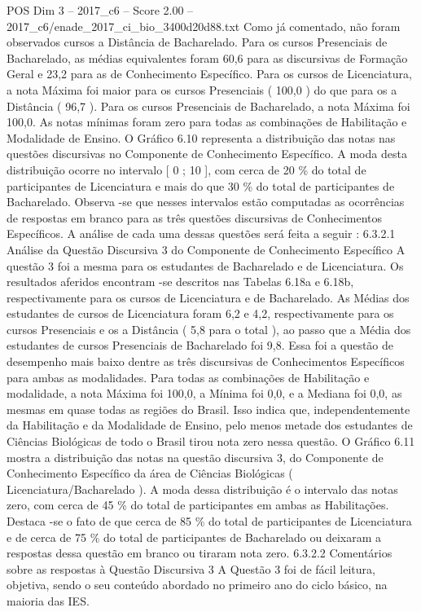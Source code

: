\begin{textsample}{POS Dim 3 – 2017\_c6 – Score 2.00 – 2017\_c6/enade\_2017\_ci\_bio\_3400d20d88.txt}
Como já comentado, não foram observados cursos a Distância de Bacharelado.
Para os cursos Presenciais de Bacharelado, as médias equivalentes foram 60,6 para as discursivas de Formação Geral e 23,2 para as de Conhecimento Específico.
Para os cursos de Licenciatura, a nota Máxima foi maior para os cursos Presenciais ( 100,0 ) do que para os a Distância ( 96,7 ).
Para os cursos Presenciais de Bacharelado, a nota Máxima foi 100,0.
As notas mínimas foram zero para todas as combinações de Habilitação e Modalidade de Ensino.
O Gráfico 6.10 representa a distribuição das notas nas questões discursivas no Componente de Conhecimento Específico.
A moda desta distribuição ocorre no intervalo [ 0 ; 10 ], com cerca de 20 \% do total de participantes de Licenciatura e mais do que 30 \% do total de participantes de Bacharelado.
Observa -se que nesses intervalos estão computadas as ocorrências de respostas em branco para as três questões discursivas de Conhecimentos Específicos.
A análise de cada uma dessas questões será feita a seguir : 6.3.2.1 Análise da Questão Discursiva 3 do Componente de Conhecimento Específico A questão 3 foi a mesma para os estudantes de Bacharelado e de Licenciatura.
Os resultados aferidos encontram -se descritos nas Tabelas 6.18a e 6.18b, respectivamente para os cursos de Licenciatura e de Bacharelado.
As Médias dos estudantes de cursos de Licenciatura foram 6,2 e 4,2, respectivamente para os cursos Presenciais e os a Distância ( 5,8 para o total ), ao passo que a Média dos estudantes de cursos Presenciais de Bacharelado foi 9,8.
Essa foi a questão de desempenho mais baixo dentre as três discursivas de Conhecimentos Específicos para ambas as modalidades.
Para todas as combinações de Habilitação e modalidade, a nota Máxima foi 100,0, a Mínima foi 0,0, e a Mediana foi 0,0, as mesmas em quase todas as regiões do Brasil.
Isso indica que, independentemente da Habilitação e da Modalidade de Ensino, pelo menos metade dos estudantes de Ciências Biológicas de todo o Brasil tirou nota zero nessa questão.
O Gráfico 6.11 mostra a distribuição das notas na questão discursiva 3, do Componente de Conhecimento Específico da área de Ciências Biológicas ( Licenciatura/Bacharelado ).
A moda dessa distribuição é o intervalo das notas zero, com cerca de 45 \% do total de participantes em ambas as Habilitações.
Destaca -se o fato de que cerca de 85 \% do total de participantes de Licenciatura e de cerca de 75 \% do total de participantes de Bacharelado ou deixaram a respostas dessa questão em branco ou tiraram nota zero. 6.3.2.2 Comentários sobre as respostas à Questão Discursiva 3 A Questão 3 foi de fácil leitura, objetiva, sendo o seu conteúdo abordado no primeiro ano do ciclo básico, na maioria das IES.

\end{textsample}
